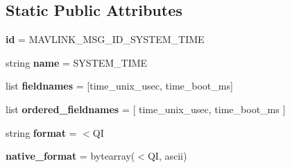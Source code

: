 \subsection*{Static Public Attributes}
\begin{DoxyCompactItemize}
\item 
\mbox{\label{classpymavlink_1_1dialects_1_1v10_1_1MAVLink__system__time__message_accfc7be2d8dc4ed1f7838111baeb46ae}} 
{\bfseries id} = M\+A\+V\+L\+I\+N\+K\+\_\+\+M\+S\+G\+\_\+\+I\+D\+\_\+\+S\+Y\+S\+T\+E\+M\+\_\+\+T\+I\+ME
\item 
\mbox{\label{classpymavlink_1_1dialects_1_1v10_1_1MAVLink__system__time__message_af3980d7b2c7864a7a3ca6d31943f2a62}} 
string {\bfseries name} = \textquotesingle{}S\+Y\+S\+T\+E\+M\+\_\+\+T\+I\+ME\textquotesingle{}
\item 
\mbox{\label{classpymavlink_1_1dialects_1_1v10_1_1MAVLink__system__time__message_a93058ea4cc401074c50b48f655cc2372}} 
list {\bfseries fieldnames} = \mbox{[}\textquotesingle{}time\+\_\+unix\+\_\+usec\textquotesingle{}, \textquotesingle{}time\+\_\+boot\+\_\+ms\textquotesingle{}\mbox{]}
\item 
\mbox{\label{classpymavlink_1_1dialects_1_1v10_1_1MAVLink__system__time__message_a9a3d41e38bff1793b9aaf67d04f32fd3}} 
list {\bfseries ordered\+\_\+fieldnames} = \mbox{[} \textquotesingle{}time\+\_\+unix\+\_\+usec\textquotesingle{}, \textquotesingle{}time\+\_\+boot\+\_\+ms\textquotesingle{} \mbox{]}
\item 
\mbox{\label{classpymavlink_1_1dialects_1_1v10_1_1MAVLink__system__time__message_a88e9217a46701fda81634e155e3c7466}} 
string {\bfseries format} = \textquotesingle{}$<$QI\textquotesingle{}
\item 
\mbox{\label{classpymavlink_1_1dialects_1_1v10_1_1MAVLink__system__time__message_af8a303265e5f3574798620aaf5bae9ba}} 
{\bfseries native\+\_\+format} = bytearray(\textquotesingle{}$<$QI\textquotesingle{}, \textquotesingle{}ascii\textquotesingle{})

\end{DoxyCompactItemize}
